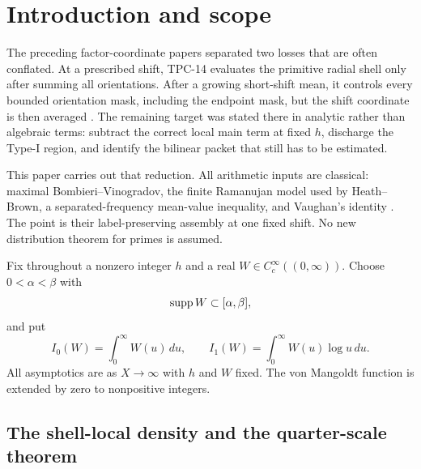 \section{Introduction and scope}
\label{sec:introduction}

The preceding factor-coordinate papers separated two losses that are often
conflated.  At a prescribed shift, TPC-14 evaluates the primitive radial
shell only after summing all orientations.  After a growing short-shift
mean, it controls every bounded orientation mask, including the endpoint
mask, but the shift coordinate is then averaged \citep{WangTPC14}.  The
remaining target was stated there in analytic rather than algebraic terms:
subtract the correct local main term at fixed $h$, discharge the Type-I
region, and identify the bilinear packet that still has to be estimated.

This paper carries out that reduction.  All arithmetic inputs are
classical: maximal Bombieri--Vinogradov, the finite Ramanujan model used by
Heath--Brown, a separated-frequency mean-value inequality, and Vaughan's
identity \citep{Bombieri1965,Vinogradov1965,HeathBrown1985,Vaughan1977}.
The point is their label-preserving assembly at one fixed shift.  No new
distribution theorem for primes is assumed.

Fix throughout a nonzero integer $h$ and a real
$W\in C_c^\infty((0,\infty))$.  Choose
$0<\alpha<\beta$ with
\begin{equation}
 \operatorname{supp} W\subset[\alpha,\beta],
 \label{eq:W-support}
\end{equation}
and put
\begin{equation}
 I_0(W)=\int_0^\infty W(u)\,du,
 \qquad
 I_1(W)=\int_0^\infty W(u)\log u\,du.
 \label{eq:weight-integrals}
\end{equation}
All asymptotics are as $X\to\infty$ with $h$ and $W$ fixed.  The
von Mangoldt function is extended by zero to nonpositive integers.

\subsection{The shell-local density and the quarter-scale theorem}

